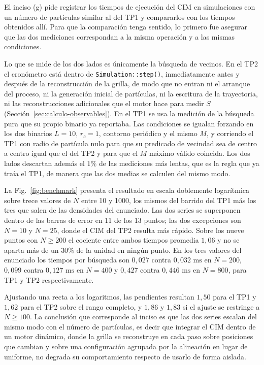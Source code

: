 \documentclass[11pt]{article}
\newcommand{\uni}[1]{\ensuremath{\mathrm{#1}}}
\begin{document}
El inciso (g) pide registrar los tiempos de ejecución del CIM en simulaciones
con un número de partículas similar al del TP1 y compararlos con los tiempos
obtenidos allí. Para que la comparación tenga sentido, lo primero fue asegurar
que las dos mediciones correspondan a la misma operación y a las mismas
condiciones.

Lo que se mide de los dos lados es únicamente la búsqueda de vecinos. En el TP2
el cronómetro está dentro de \texttt{Simulation::step()}, inmediatamente antes y
después de la reconstrucción de la grilla, de modo que no entran ni el arranque
del proceso, ni la generación inicial de partículas, ni la escritura de la
trayectoria, ni las reconstrucciones adicionales que el motor hace para medir
$S$ (Sección~\ref{sec:calculo-observables}). En el TP1 se usa la medición de la
búsqueda pura que su propio binario ya reportaba. Las condiciones se igualan
forzando en los dos binarios $L = 10$, $r_c = 1$, contorno periódico y el mismo
$M$, y corriendo el TP1 con radio de partícula nulo para que su predicado de
vecindad sea de centro a centro igual que el del TP2 y para que el $M$ máximo
válido coincida. Los dos lados descartan además el $1\%$ de las mediciones más
lentas, que es la regla que ya traía el TP1, de manera que las dos medias se
calculen del mismo modo.

La Fig.~\ref{fig:benchmark} presenta el resultado en escala doblemente
logarítmica sobre trece valores de $N$ entre 10 y 1000, los mismos del barrido
del TP1 más los tres que salen de las densidades del enunciado. Las dos series
se superponen dentro de las barras de error en 11 de los 13 puntos; las dos
excepciones son $N = 10$ y $N = 25$, donde el CIM del TP2 resulta más rápido.
Sobre los nueve puntos con $N \geq 200$ el cociente entre ambos tiempos promedia
$1{,}06$ y no se aparta más de un $30\%$ de la unidad en ningún punto. En los
tres valores del enunciado los tiempos por búsqueda son $0{,}027$ contra
$0{,}032$ \uni{ms} en $N = 200$, $0{,}099$ contra $0{,}127$ \uni{ms} en
$N = 400$ y $0{,}427$ contra $0{,}446$ \uni{ms} en $N = 800$, para TP1 y TP2
respectivamente.

Ajustando una recta a los logaritmos, las pendientes resultan $1{,}50$ para el
TP1 y $1{,}62$ para el TP2 sobre el rango completo, y $1{,}86$ y $1{,}83$ si el
ajuste se restringe a $N \geq 100$. La conclusión que corresponde al inciso es
que las dos series escalan del mismo modo con el número de partículas, es decir
que integrar el CIM dentro de un motor dinámico, donde la grilla se reconstruye
en cada paso sobre posiciones que cambian y sobre una configuración agrupada por
la alineación en lugar de uniforme, no degrada su comportamiento respecto de
usarlo de forma aislada.
\end{document}

